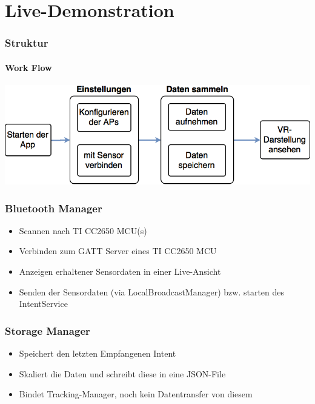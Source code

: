 \documentclass{beamer}
\begin{document}
\section{Live-Demonstration}

\begin{frame}
\frametitle{Struktur}
\framesubtitle{Work Flow}
	\includegraphics[width=\textwidth]{diagram/workflow.png}
\end{frame}


\begin{frame}
\frametitle{Bluetooth Manager}
\begin{itemize}
  \item Scannen nach TI CC2650 MCU(s)
  \item Verbinden zum GATT Server eines TI CC2650 MCU
  \item Anzeigen erhaltener Sensordaten in einer Live-Ansicht
  \item Senden der Sensordaten (via LocalBroadcastManager) bzw. starten des IntentService
\end{itemize}
\end{frame}

\begin{frame}
\frametitle{Storage Manager}
\begin{itemize}
  \item Speichert den letzten Empfangenen Intent
  \item Skaliert die Daten und schreibt diese in eine JSON-File
  \item Bindet Tracking-Manager, noch kein Datentransfer von diesem
\end{itemize}
\end{frame}
\end{document}
